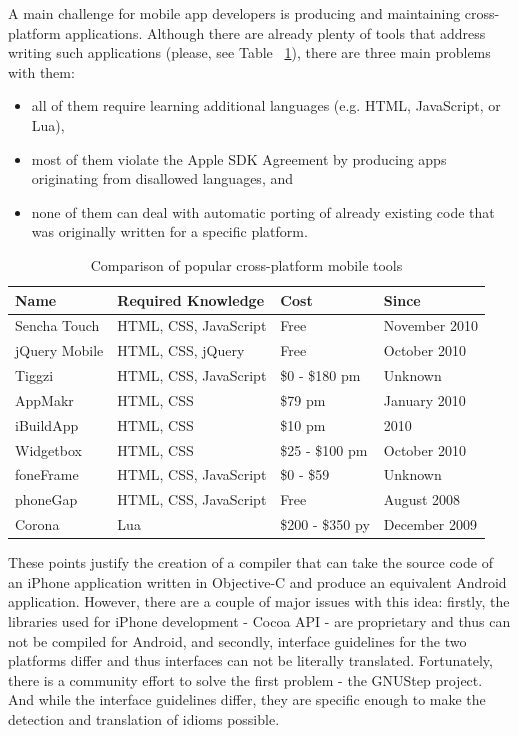 \documentclass[parskip]{cs4rep}
\begin{document}
A main challenge for mobile app developers is producing and maintaining cross-platform applications. Although there are already plenty of tools that address writing such applications (please, see Table ~\ref{tab:crossPlatformTools}), there are three main problems with them:

\begin{itemize}
\item
all of them require learning additional languages (e.g. HTML, JavaScript, or
Lua),
\item
most of them violate the Apple SDK Agreement \cite{P5} \cite{P6} by
producing apps originating from disallowed languages, and
\item
none of them can deal with automatic porting of already existing code that was
originally written for a specific platform.
\end{itemize}

\begin{table}
    \centering
    \begin{tabular}{ | l | p{4.4cm} | p{2.6cm} | p{3cm} |}
    \hline
    Name & Required Knowledge & Cost & Since \\ \hline
    Sencha Touch & HTML, CSS, JavaScript & Free & November 2010 \\ \hline
    jQuery Mobile & HTML, CSS, jQuery & Free & October 2010 \\ \hline
    Tiggzi & HTML, CSS, JavaScript & \$0 - \$180 pm & Unknown \\ \hline
    AppMakr & HTML, CSS & \$79 pm & January 2010 \\ \hline
    iBuildApp & HTML, CSS & \$10 pm & 2010 \\ \hline
    Widgetbox & HTML, CSS & \$25 - \$100 pm & October 2010 \\ \hline
    foneFrame & HTML, CSS, JavaScript & \$0 - \$59 & Unknown \\ \hline
    phoneGap & HTML, CSS, JavaScript & Free & August 2008 \\ \hline
    Corona & Lua & \$200 - \$350 py & December 2009 \\ \hline
    \end{tabular}
    \caption{Comparison of popular cross-platform mobile tools \cite{P4}}
    \label{tab:crossPlatformTools}
\end{table}

These points justify the creation of a compiler that can take the source code of
an iPhone application written in Objective-C and produce an equivalent Android
application. However, there are a couple of major issues with this idea:
firstly, the libraries used for iPhone development - Cocoa API - are proprietary
and thus can not be compiled for Android, and secondly, interface guidelines for
the two platforms differ and thus interfaces can not be literally translated.
Fortunately, there is a community effort to solve the first problem - the
GNUStep project. And while the interface guidelines differ, they are
specific enough to make the detection and translation of idioms possible.
\end{document}
